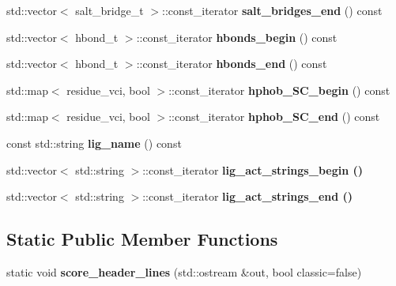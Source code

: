 \begin{CompactItemize}
\item 
std::vector$<$ salt\_\-bridge\_\-t $>$::const\_\-iterator \textbf{salt\_\-bridges\_\-end} () const \label{classSimSite3D_1_1ProtLigScore_ea289b8b558b201953876c8e9ed0f4a3}

\item 
std::vector$<$ hbond\_\-t $>$::const\_\-iterator \textbf{hbonds\_\-begin} () const \label{classSimSite3D_1_1ProtLigScore_52476c5b5fdeb1e03c06f92ab6be71e0}

\item 
std::vector$<$ hbond\_\-t $>$::const\_\-iterator \textbf{hbonds\_\-end} () const \label{classSimSite3D_1_1ProtLigScore_9c33162446d3ba3d1788878ffea98039}

\item 
std::map$<$ residue\_\-vci, bool $>$::const\_\-iterator \textbf{hphob\_\-SC\_\-begin} () const \label{classSimSite3D_1_1ProtLigScore_78531873dda937cd13058da1898dc9b9}

\item 
std::map$<$ residue\_\-vci, bool $>$::const\_\-iterator \textbf{hphob\_\-SC\_\-end} () const \label{classSimSite3D_1_1ProtLigScore_2450c044ac7c187dd0cf1a74fd3f15ad}

\item 
const std::string \textbf{lig\_\-name} () const \label{classSimSite3D_1_1ProtLigScore_c17dbe0c860a1d3f6b43c6e82eade318}

\item 
std::vector$<$ std::string $>$::const\_\-iterator \bf{lig\_\-act\_\-strings\_\-begin} ()
\item 
std::vector$<$ std::string $>$::const\_\-iterator \bf{lig\_\-act\_\-strings\_\-end} ()
\end{CompactItemize}
\subsection*{Static Public Member Functions}
\begin{CompactItemize}
\item 
static void \textbf{score\_\-header\_\-lines} (std::ostream \&out, bool classic=false)\label{classSimSite3D_1_1ProtLigScore_dc5ffb2f1b082529473e3ee6f2843ba8}

\end{CompactItemize}
